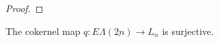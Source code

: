 \documentclass{amsbook} %
\newcommand{\EL}{E\Lambda}
\newenvironment{eq*}{\begin{equation*}}{\end{equation*}}
\numberwithin{section}{chapter}
\begin{document}
\begin{proof}
\end{proof}


\begin{cor}\label{qsurj} The cokernel map $q: \EL(\underline{2n}) \to L_n$ is surjective.
\end{cor}
\end{document}
